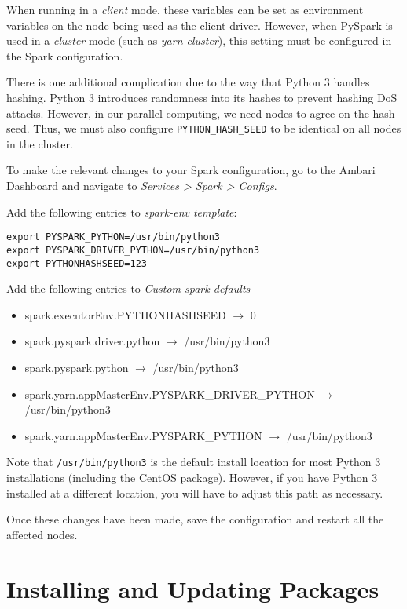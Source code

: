 \documentclass[9pt,twocolumn,twoside]{idsi}
\begin{document}
When running in a \emph{client} mode, these variables can be set as environment variables on the node being used as the client driver. However, when PySpark is used in a \emph{cluster} mode (such as \emph{yarn-cluster}), this setting must be configured in the Spark configuration.

There is one additional complication due to the way that Python 3 handles hashing. Python 3 introduces randomness into its hashes to prevent hashing DoS attacks. However, in our parallel computing, we need nodes to agree on the hash seed. Thus, we must also configure \texttt{PYTHON\_HASH\_SEED} to be identical on all nodes in the cluster.

To make the relevant changes to your Spark configuration, go to the Ambari Dashboard and navigate to \emph{Services > Spark > Configs}.

Add the following entries to \emph{spark-env template}:

\begin{lstlisting}
export PYSPARK_PYTHON=/usr/bin/python3
export PYSPARK_DRIVER_PYTHON=/usr/bin/python3
export PYTHONHASHSEED=123
\end{lstlisting}

Add the following entries to \emph{Custom spark-defaults}
\begin{itemize}
  \item spark.executorEnv.PYTHONHASHSEED $\rightarrow$ 0

  \item spark.pyspark.driver.python $\rightarrow$ /usr/bin/python3

  \item spark.pyspark.python $\rightarrow$ /usr/bin/python3

  \item spark.yarn.appMasterEnv.PYSPARK\_DRIVER\_PYTHON $\rightarrow$ /usr/bin/python3

  \item spark.yarn.appMasterEnv.PYSPARK\_PYTHON $\rightarrow$ /usr/bin/python3
\end{itemize}

Note that \texttt{/usr/bin/python3} is the default install location for most Python 3 installations (including the CentOS package). However, if you have Python 3 installed at a different location, you will have to adjust this path as necessary.

Once these changes have been made, save the configuration and restart all the affected nodes.

\section{Installing and Updating Packages}
\end{document}
